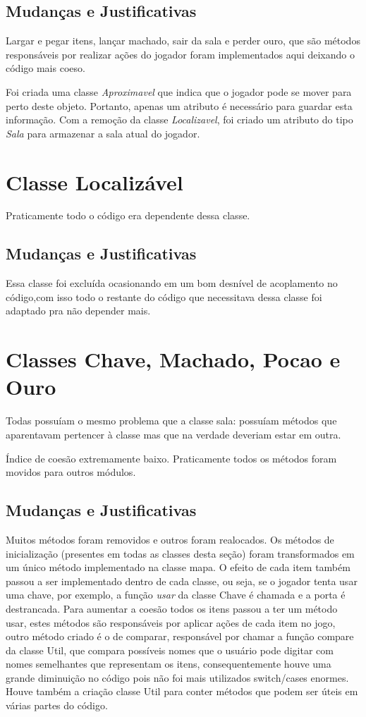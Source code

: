 \documentclass[runningheads,a4paper]{llncs}
\begin{document}
    \subsection{Mudanças e Justificativas}
        Largar e pegar itens, lançar machado, sair da sala e perder ouro, que são métodos responsáveis por realizar ações do jogador foram implementados aqui deixando o código mais coeso.
        
        Foi criada uma classe \emph{Aproximavel} que indica que o jogador pode se mover para perto deste objeto. Portanto, apenas um atributo é necessário para guardar esta informação. Com a remoção da classe \emph{Localizavel}, foi criado um atributo do tipo \emph{Sala} para armazenar a sala atual do jogador.

\section{Classe Localizável}
    Praticamente todo o código era dependente dessa classe.

    \subsection{Mudanças e Justificativas}
        Essa classe foi excluída ocasionando em um bom desnível de acoplamento no código,com isso todo o restante do código que necessitava dessa classe foi adaptado pra não depender mais. 

\section{Classes Chave, Machado, Pocao e Ouro}
    Todas possuíam o mesmo problema que a classe sala: possuíam métodos que aparentavam pertencer à classe mas que na verdade deveriam estar em outra.
    
    Índice de coesão extremamente baixo. Praticamente todos os métodos foram movidos para outros módulos.
    
    \subsection{Mudanças e Justificativas}
        Muitos métodos foram removidos e outros foram realocados. Os métodos de inicialização (presentes em todas as classes desta seção) foram transformados em um único método implementado na classe mapa.
        O efeito de cada item também passou a ser implementado dentro de cada classe, ou seja, se o jogador tenta usar uma chave, por exemplo, a função \emph{usar} da classe Chave é chamada e a porta é destrancada. %
        Para aumentar a coesão todos os itens passou a ter um método usar, estes métodos são responsáveis por aplicar ações de cada item no jogo, outro método criado é o de comparar, responsável por chamar a função compare da classe Util, que compara possíveis nomes que o usuário pode digitar com nomes semelhantes que representam os itens, consequentemente houve uma grande diminuição no código pois não foi mais utilizados switch/cases enormes. Houve também a criação classe Util para conter métodos que podem ser úteis em várias partes do código.
\end{document}
